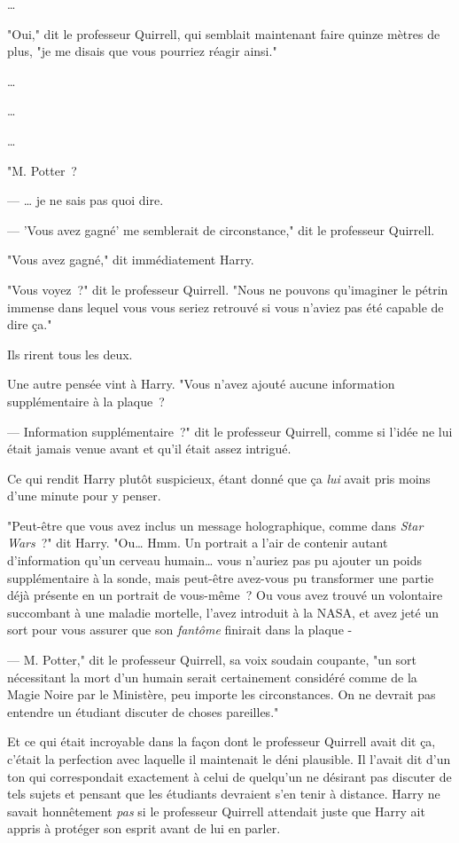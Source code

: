 …

"Oui," dit le professeur Quirrell, qui semblait maintenant faire quinze mètres de plus, "je me disais que vous pourriez réagir ainsi."

…

…

…

"M. Potter~?

--- … je ne sais pas quoi dire.

--- 'Vous avez gagné' me semblerait de circonstance," dit le professeur Quirrell.

"Vous avez gagné," dit immédiatement Harry.

"Vous voyez~?" dit le professeur Quirrell. "Nous ne pouvons qu'imaginer le pétrin immense dans lequel vous vous seriez retrouvé si vous n'aviez pas été capable de dire ça."

Ils rirent tous les deux.

Une autre pensée vint à Harry. "Vous n'avez ajouté aucune information supplémentaire à la plaque~?

--- Information supplémentaire~?" dit le professeur Quirrell, comme si l'idée ne lui était jamais venue avant et qu'il était assez intrigué.

Ce qui rendit Harry plutôt suspicieux, étant donné que ça \emph{lui} avait pris moins d'une minute pour y penser.

"Peut-être que vous avez inclus un message holographique, comme dans \emph{Star Wars}~?" dit Harry. "Ou… Hmm. Un portrait a l'air de contenir autant d'information qu'un cerveau humain… vous n'auriez pas pu ajouter un poids supplémentaire à la sonde, mais peut-être avez-vous pu transformer une partie déjà présente en un portrait de vous-même~? Ou vous avez trouvé un volontaire succombant à une maladie mortelle, l'avez introduit à la NASA, et avez jeté un sort pour vous assurer que son \emph{fantôme} finirait dans la plaque -

--- M. Potter," dit le professeur Quirrell, sa voix soudain coupante, "un sort nécessitant la mort d'un humain serait certainement considéré comme de la Magie Noire par le Ministère, peu importe les circonstances. On ne devrait pas entendre un étudiant discuter de choses pareilles."

Et ce qui était incroyable dans la façon dont le professeur Quirrell avait dit ça, c'était la perfection avec laquelle il maintenait le déni plausible. Il l'avait dit d'un ton qui correspondait exactement à celui de quelqu'un ne désirant pas discuter de tels sujets et pensant que les étudiants devraient s'en tenir à distance. Harry ne savait honnêtement \emph{pas} si le professeur Quirrell attendait juste que Harry ait appris à protéger son esprit avant de lui en parler.

